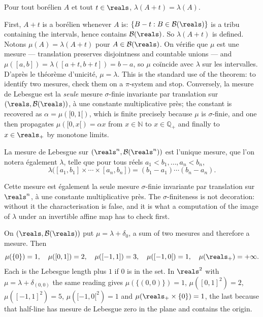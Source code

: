 \begin{prop}
  Pour tout borélien $A$ et tout $t \in \reals$, $\lambda(A + t) = \lambda(A)$.
\end{prop}

\begin{remark}
  First, $A + t$ is a borélien whenever $A$ is: $\{B - t : B \in
  \mathcal{B}(\reals)\}$ is a tribu containing the intervals, hence contains
  $\mathcal{B}(\reals)$. So $\lambda(A+t)$ is defined. Notons $\mu(A) =
  \lambda(A+t)$ pour $A \in \mathcal{B}(\reals)$. On vérifie que
  $\mu$ est une mesure --- translation preserves disjointness and countable unions
  --- and $\mu([a,b]) = \lambda([a+t,b+t]) = b-a$, so $\mu$ coïncide avec $\lambda$
  sur les intervalles. D'après le théorème d'unicité, $\mu = \lambda$. This is the
  standard use of the theorem: to identify two mesures, check them on a
  $\pi$-system and stop. Conversely, la mesure de Lebesgue est la \emph{seule}
  mesure $\sigma$-finie invariante par translation sur $(\reals,\mathcal{B}(\reals))$,
  à une constante multiplicative près; the constant is recovered as $\alpha =
  \mu([0,1[)$, which is finite precisely because $\mu$ is $\sigma$-finie, and one
  then propagates $\mu([0,x[) = \alpha x$ from $x \in \mathbb{N}$ to $x \in
  \mathbb{Q}_{+}$ and finally to $x \in \reals_{+}$ by monotone limits.
\end{remark}

\begin{definition}
  La mesure de Lebesgue sur $(\reals^{n},\mathcal{B}(\reals^{n}))$ est l'unique
  mesure, que l'on notera également $\lambda$, telle que pour tous réels $a_{1} <
  b_{1}, \ldots, a_{n} < b_{n}$,
  \[
    \lambda\bigl([a_{1},b_{1}] \times \cdots \times [a_{n},b_{n}]\bigr)
    = (b_{1}-a_{1}) \cdots (b_{n}-a_{n}).
  \]
\end{definition}

Cette mesure est également la seule mesure $\sigma$-finie invariante par translation
sur $\reals^{n}$, à une constante multiplicative près. The $\sigma$-finiteness is
not decoration: without it the characterisation is false, and it is what a
computation of the image of $\lambda$ under an invertible affine map has to check
first.

\begin{example}
  On $(\reals,\mathcal{B}(\reals))$ put $\mu = \lambda + \delta_{0}$, a sum of two
  mesures and therefore a mesure. Then
  \[
    \mu(\{0\}) = 1, \quad \mu([0,1]) = 2, \quad \mu([-1,1]) = 3, \quad
    \mu([-1,0[) = 1, \quad \mu(\reals_{+}) = +\infty.
  \]
  Each is the Lebesgue length plus $1$ if $0$ is in the set. In $\reals^{2}$ with
  $\mu = \lambda + \delta_{(0,0)}$ the same reading gives $\mu(\{(0,0)\}) = 1$,
  $\mu([0,1]^{2}) = 2$, $\mu([-1,1]^{2}) = 5$, $\mu([-1,0[^{2}) = 1$ and
  $\mu(\reals_{+} \times \{0\}) = 1$, the last because that half-line has mesure de
  Lebesgue zero in the plane and contains the origin.
\end{example}

